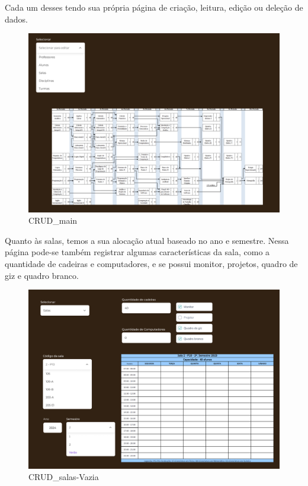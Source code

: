
    Cada um desses tendo sua própria página de criação, leitura, edição ou deleção de dados.

    \begin{figure}[htbp]\centering
        \caption{\label{fig:CRUD_main} CRUD_main}
        \includegraphics[scale=0.8]{files/img/Prototipo/CRUD_main.png}
    \end{figure} %

    Quanto às salas, temos a sua alocação atual baseado no ano e semestre. Nessa página pode-se também registrar algumas características da sala, como a quantidade de cadeiras e computadores, e se possui monitor, projetos, quadro de giz e quadro branco.

    \begin{figure}[htbp]\centering
        \caption{\label{fig:CRUD_salas-Vazia} CRUD_salas-Vazia}
        \includegraphics[scale=0.8]{files/img/Prototipo/CRUD_salas-Vazia.png}
    \end{figure} %

